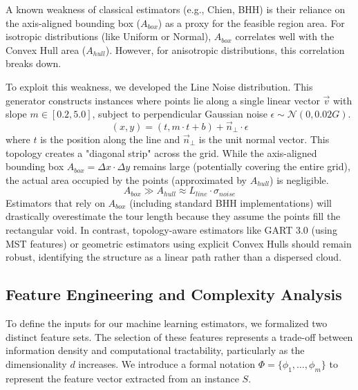 \documentclass{article}
\begin{document}
A known weakness of classical estimators (e.g., Chien, BHH) is their reliance on the axis-aligned bounding box ($A_{box}$) as a proxy for the feasible region area. For isotropic distributions (like Uniform or Normal), $A_{box}$ correlates well with the Convex Hull area ($A_{hull}$). However, for anisotropic distributions, this correlation breaks down.

To exploit this weakness, we developed the Line Noise distribution. This generator constructs instances where points lie along a single linear vector $\vec{v}$ with slope $m \in [0.2, 5.0]$, subject to perpendicular Gaussian noise $\epsilon \sim \mathcal{N}(0, 0.02G)$.
\begin{equation}
    (x, y) = (t, m \cdot t + b) + \vec{n}_{\perp} \cdot \epsilon
\end{equation}
where $t$ is the position along the line and $\vec{n}_{\perp}$ is the unit normal vector.
This topology creates a "diagonal strip" across the grid. While the axis-aligned bounding box $A_{box} = \Delta x \cdot \Delta y$ remains large (potentially covering the entire grid), the actual area occupied by the points (approximated by $A_{hull}$) is negligible.
\begin{equation}
    A_{box} \gg A_{hull} \approx L_{line} \cdot \sigma_{noise}
\end{equation}
Estimators that rely on $A_{box}$ (including standard BHH implementations) will drastically overestimate the tour length because they assume the points fill the rectangular void. In contrast, topology-aware estimators like GART 3.0 (using MST features) or geometric estimators using explicit Convex Hulls should remain robust, identifying the structure as a linear path rather than a dispersed cloud.

\subsection{Feature Engineering and Complexity Analysis}
\label{subsec:feature_engineering}

To define the inputs for our machine learning estimators, we formalized two distinct feature sets. The selection of these features represents a trade-off between information density and computational tractability, particularly as the dimensionality $d$ increases. We introduce a formal notation $\Phi = \{ \phi_1, \dots, \phi_m \}$ to represent the feature vector extracted from an instance $S$.
\end{document}
